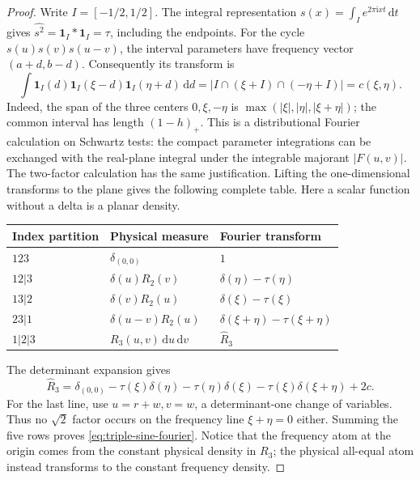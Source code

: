 \documentclass[11pt]{article}
\newcommand{\ii}{\mathrm i}
\newcommand{\dd}{\,\mathrm d}
\begin{document}
\begin{proof}
Write \(I=[-1/2,1/2]\). The integral representation
\(s(x)=\int_I e^{2\pi\ii xt}\dd t\) gives
\(\widehat{s^2}=\mathbf1_I*\mathbf1_I=\tau\), including the endpoints.
For the cycle \(s(u)s(v)s(u-v)\), the interval parameters have frequency
vector \((a+d,b-d)\). Consequently its transform is
\[
 \int\mathbf1_I(d)\mathbf1_I(\xi-d)\mathbf1_I(\eta+d)\dd d
 =|I\cap(\xi+I)\cap(-\eta+I)|=c(\xi,\eta).
\]
Indeed, the span of the three centers \(0,\xi,-\eta\) is
\(\max(|\xi|,|\eta|,|\xi+\eta|)\); the common interval has length
\((1-h)_+\). This is a distributional Fourier calculation on Schwartz
tests: the compact parameter integrations can be exchanged with the
real-plane integral under the integrable majorant \(|F(u,v)|\).
The two-factor calculation has the same justification. Lifting the
one-dimensional transforms to the plane gives the following complete
table. Here a scalar function without a delta is a planar density.
\begin{center}
\small
\begin{tabular}{lll}
\toprule
Index partition & Physical measure & Fourier transform\\
\midrule
\(123\) & \(\delta_{(0,0)}\) & \(1\)\\
\(12|3\) & \(\delta(u)R_2(v)\) & \(\delta(\eta)-\tau(\eta)\)\\
\(13|2\) & \(\delta(v)R_2(u)\) & \(\delta(\xi)-\tau(\xi)\)\\
\(23|1\) & \(\delta(u-v)R_2(u)\) & \(\delta(\xi+\eta)-\tau(\xi+\eta)\)\\
\(1|2|3\) & \(R_3(u,v)\dd u\dd v\) & \(\widehat R_3\)\\
\bottomrule
\end{tabular}
\end{center}
The determinant expansion gives
\[
 \widehat R_3=\delta_{(0,0)}-\tau(\xi)\delta(\eta)
 -\tau(\eta)\delta(\xi)-\tau(\xi)\delta(\xi+\eta)+2c.
\]
For the last line, use \(u=r+w,v=w\), a determinant-one change of
variables. Thus no \(\sqrt2\) factor occurs on the frequency line
\(\xi+\eta=0\) either. Summing the five rows proves
\eqref{eq:triple-sine-fourier}. Notice that the frequency atom at the
origin comes from the constant physical density in \(R_3\); the physical
all-equal atom instead transforms to the constant frequency density.


\end{proof}
\end{document}
